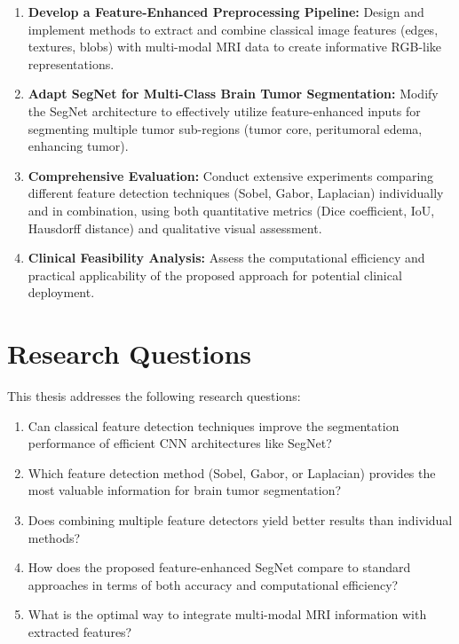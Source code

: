 \begin{enumerate}
    \item \textbf{Develop a Feature-Enhanced Preprocessing Pipeline:} Design and implement methods to extract and combine classical image features (edges, textures, blobs) with multi-modal MRI data to create informative RGB-like representations.
    
    \item \textbf{Adapt SegNet for Multi-Class Brain Tumor Segmentation:} Modify the SegNet architecture to effectively utilize feature-enhanced inputs for segmenting multiple tumor sub-regions (tumor core, peritumoral edema, enhancing tumor).
    
    \item \textbf{Comprehensive Evaluation:} Conduct extensive experiments comparing different feature detection techniques (Sobel, Gabor, Laplacian) individually and in combination, using both quantitative metrics (Dice coefficient, IoU, Hausdorff distance) and qualitative visual assessment.
    
    \item \textbf{Clinical Feasibility Analysis:} Assess the computational efficiency and practical applicability of the proposed approach for potential clinical deployment.
\end{enumerate}

\section{Research Questions}
\label{sec:research_questions}

This thesis addresses the following research questions:

\begin{enumerate}
    \item Can classical feature detection techniques improve the segmentation performance of efficient CNN architectures like SegNet?
    \item Which feature detection method (Sobel, Gabor, or Laplacian) provides the most valuable information for brain tumor segmentation?
    \item Does combining multiple feature detectors yield better results than individual methods?
    \item How does the proposed feature-enhanced SegNet compare to standard approaches in terms of both accuracy and computational efficiency?
    \item What is the optimal way to integrate multi-modal MRI information with extracted features?
\end{enumerate}

